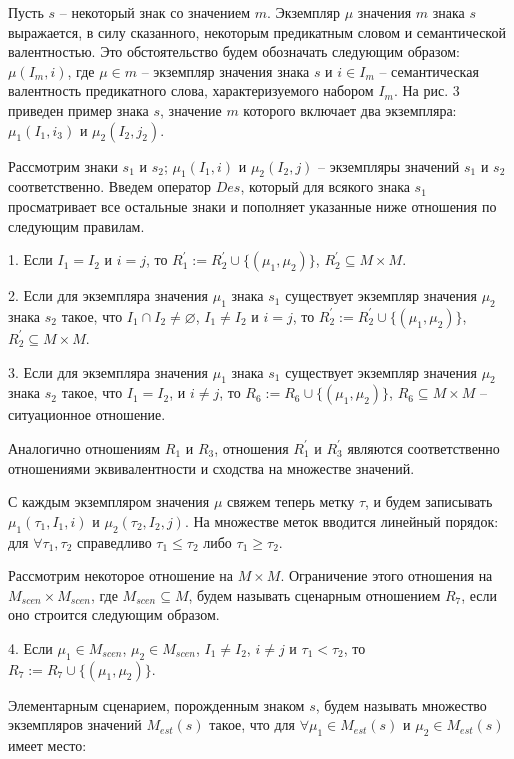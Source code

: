 Пусть $s$ – некоторый знак со значением $m$. Экземпляр $\mu$ значения $m$ знака $s$ выражается, в силу сказанного, некоторым предикатным словом и семантической валентностью. Это обстоятельство будем обозначать следующим образом: $\mu(I_m,i)$, где $\mu\in m$ – экземпляр значения знака $s$ и $i\in I_m$ – семантическая валентность предикатного слова, характеризуемого набором $I_m$. На рис. 3 приведен пример знака $s$, значение $m$ которого включает два экземпляра: $\mu_1(I_1,i_3)$ и $\mu_2(I_2,j_2)$.

Рассмотрим знаки $s_1$ и $s_2$; $\mu_1(I_1,i)$ и $\mu_2(I_2,j)$ – экземпляры значений $s_1$ и $s_2$ соответственно. Введем оператор $Des$, который для всякого знака $s_1$ просматривает все остальные знаки и пополняет указанные ниже отношения по следующим правилам.

1. Если $I_1=I_2$ и $i=j$, то $R_1^\prime:=R_2^\prime\cup\{(\mu_1,\mu_2)\}$, $R_2^\prime\subseteq M\times M$.

2. Если для экземпляра значения $\mu_1$ знака $s_1$ существует экземпляр значения $\mu_2$ знака $s_2$ такое, что $I_1\cap I_2\not =\varnothing$, $I_1\not =I_2$ и $i=j$, то $R_2^\prime:=R_2^\prime\cup\{(\mu_1,\mu_2)\}$, $R_2^\prime\subseteq M\times M$.

3. Если для экземпляра значения $\mu_1$ знака $s_1$ существует экземпляр значения $\mu_2$ знака $s_2$ такое, что $I_1=I_2$, и $i\not =j$, то $R_6:=R_6\cup\{(\mu_1,\mu_2)\}$, $R_6\subseteq M\times M$ – ситуационное отношение.

Аналогично отношениям $R_1$ и $R_3$, отношения $R_1^\prime$ и $R_3^\prime$ являются соответственно отношениями эквивалентности и сходства на множестве значений. 

С каждым экземпляром значения $\mu$ свяжем теперь метку $\tau$, и будем записывать $\mu_1(\tau_1,I_1,i)$ и $\mu_2(\tau_2,I_2,j)$. На множестве меток вводится линейный порядок: для $\forall\tau_1,\tau_2$ справедливо $\tau_1\leqslant\tau_2$ либо $\tau_1\geqslant\tau_2$.

Рассмотрим некоторое отношение на $M\times M$. Ограничение этого отношения на $M_{scen}\times M_{scen}$, где $M_{scen}\subseteq M$, будем называть сценарным отношением $R_7$, если оно строится следующим образом.

4. Если $\mu_1\in M_{scen}$, $\mu_2\in M_{scen}$, $I_1\not =I_2$, $i\not =j$ и $\tau_1<\tau_2$, то $R_7:=R_7\cup\{(\mu_1,\mu_2)\}$.

Элементарным сценарием, порожденным знаком $s$, будем называть множество экземпляров значений $M_{est}(s)$ такое, что для $\forall\mu_1\in M_{est}(s)$ и $\mu_2\in M_{est}(s)$ имеет место:

